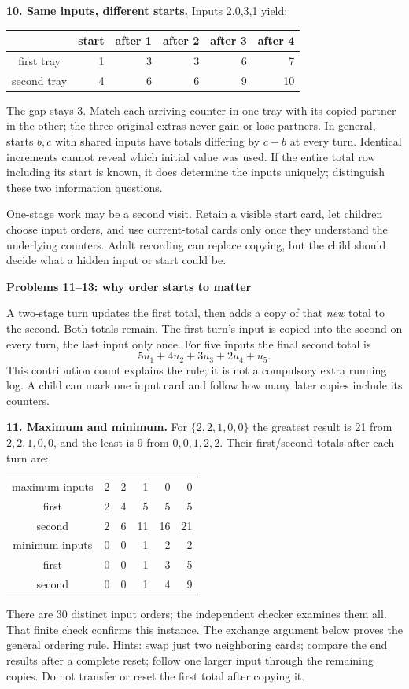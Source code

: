 \documentclass[11pt]{article}
\newcommand{\heading}[1]{\par\textbf{#1}\par}
\begin{document}
\textbf{10. Same inputs, different starts.} Inputs 2,0,3,1 yield:
\begin{center}\begin{tabular}{c|rrrrr}
&start&after 1&after 2&after 3&after 4\\\hline
first tray&1&3&3&6&7\\
second tray&4&6&6&9&10
\end{tabular}\end{center}
The gap stays 3. Match each arriving counter in one tray with its copied partner in the other; the three original extras never gain or lose partners. In general, starts $b,c$ with shared inputs have totals differing by $c-b$ at every turn. Identical increments cannot reveal which initial value was used. If the entire total row including its start is known, it does determine the inputs uniquely; distinguish these two information questions.

One-stage work may be a second visit. Retain a visible start card, let children choose input orders, and use current-total cards only once they understand the underlying counters. Adult recording can replace copying, but the child should decide what a hidden input or start could be.
\newpage
\heading{Problems 11--13: why order starts to matter}
A two-stage turn updates the first total, then adds a copy of that \emph{new} total to the second. Both totals remain. The first turn's input is copied into the second on every turn, the last input only once. For five inputs the final second total is
\[5u_1+4u_2+3u_3+2u_4+u_5.\]
This contribution count explains the rule; it is not a compulsory extra running log. A child can mark one input card and follow how many later copies include its counters.

\textbf{11. Maximum and minimum.} For $\{2,2,1,0,0\}$ the greatest result is 21 from $2,2,1,0,0$, and the least is 9 from $0,0,1,2,2$. Their first/second totals after each turn are:
\begin{center}\begin{tabular}{c|rrrrr}
maximum inputs&2&2&1&0&0\\
first&2&4&5&5&5\\
second&2&6&11&16&21\\\hline
minimum inputs&0&0&1&2&2\\
first&0&0&1&3&5\\
second&0&0&1&4&9
\end{tabular}\end{center}
There are 30 distinct input orders; the independent checker examines them all. That finite check confirms this instance. The exchange argument below proves the general ordering rule. Hints: swap just two neighboring cards; compare the end results after a complete reset; follow one larger input through the remaining copies. Do not transfer or reset the first total after copying it.
\end{document}
